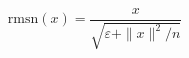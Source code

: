 \documentclass{article}
\begin{document}
\begin{preview}

\[ \mathrm{rmsn}(x) = \dfrac{x}{\sqrt{\varepsilon + \|x\|^2 / n}} \]

\end{preview}
\end{document}
